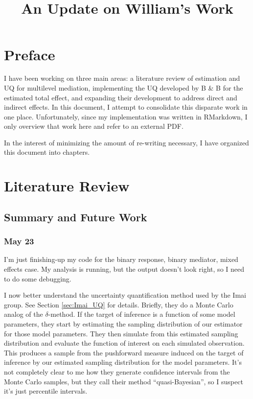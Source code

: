 \documentclass{report}
\title{An Update on William's Work}
\begin{document}
\maketitle

\chapter*{Preface}


I have been working on three main areas: a literature review of estimation and UQ for multilevel mediation, implementing the UQ developed by B \& B for the estimated total effect, and expanding their development to address direct and indirect effects. In this document, I attempt to consolidate this disparate work in one place. Unfortunately, since my implementation was written in RMarkdown, I only overview that work here and refer to an external PDF.

In the interest of minimizing the amount of re-writing necessary, I have organized this document into chapters.

\tableofcontents


\chapter{Literature Review}

\section{Summary and Future Work}

\subsection{May 23}

I'm just finishing-up my code for the binary response, binary mediator, mixed effects case. My analysis is running, but the output doesn't look right, so I need to do some debugging. 

I now better understand the uncertainty quantification method used by the Imai group. See Section \ref{sec:Imai_UQ} for details. Briefly, they do a Monte Carlo analog of the $\delta$-method. If the target of inference is a function of some model parameters, they start by estimating the sampling distribution of our estimator for those model parameters. They then simulate from this estimated sampling distribution and evaluate the function of interest on each simulated observation. This produces a sample from the pushforward measure induced on the target of inference by our estimated sampling distribution for the model parameters. It's not completely clear to me how they generate confidence intervals from the Monte Carlo samples, but they call their method ``quasi-Bayesian'', so I suspect it's just percentile intervals. 
\end{document}
